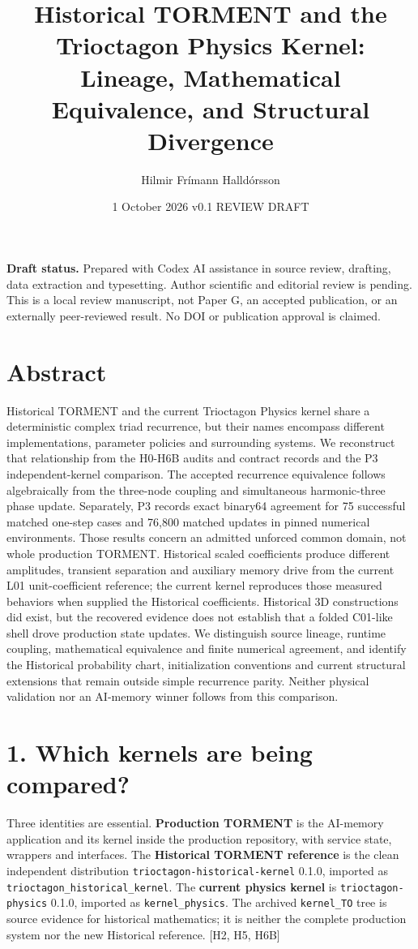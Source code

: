 \documentclass[
  11pt,
  a4paper,
]{article}
\title{Historical TORMENT and the Trioctagon Physics Kernel: Lineage, Mathematical Equivalence, and Structural Divergence}
\author{Hilmir Frímann Halldórsson}
\date{1 October 2026 \textbar{} v0.1 REVIEW DRAFT}
\begin{document}
\maketitle

\textbf{Draft status.} Prepared with Codex AI assistance in source review, drafting, data extraction and typesetting. Author scientific and editorial review is pending. This is a local review manuscript, not Paper G, an accepted publication, or an externally peer-reviewed result. No DOI or publication approval is claimed.

\section{Abstract}\label{abstract}

Historical TORMENT and the current Trioctagon Physics kernel share a deterministic complex triad recurrence, but their names encompass different implementations, parameter policies and surrounding systems. We reconstruct that relationship from the H0-H6B audits and contract records and the P3 independent-kernel comparison. The accepted recurrence equivalence follows algebraically from the three-node coupling and simultaneous harmonic-three phase update. Separately, P3 records exact binary64 agreement for 75 successful matched one-step cases and 76,800 matched updates in pinned numerical environments. Those results concern an admitted unforced common domain, not whole production TORMENT. Historical scaled coefficients produce different amplitudes, transient separation and auxiliary memory drive from the current L01 unit-coefficient reference; the current kernel reproduces those measured behaviors when supplied the Historical coefficients. Historical 3D constructions did exist, but the recovered evidence does not establish that a folded C01-like shell drove production state updates. We distinguish source lineage, runtime coupling, mathematical equivalence and finite numerical agreement, and identify the Historical probability chart, initialization conventions and current structural extensions that remain outside simple recurrence parity. Neither physical validation nor an AI-memory winner follows from this comparison.

\section{1. Which kernels are being compared?}\label{which-kernels-are-being-compared}

Three identities are essential. \textbf{Production TORMENT} is the AI-memory application and its kernel inside the production repository, with service state, wrappers and interfaces. The \textbf{Historical TORMENT reference} is the clean independent distribution \nolinkurl{trioctagon-historical-kernel} 0.1.0, imported as \nolinkurl{trioctagon_historical_kernel}. The \textbf{current physics kernel} is \texttt{trioctagon-physics} 0.1.0, imported as \texttt{kernel\_physics}. The archived \texttt{kernel\_TO} tree is source evidence for historical mathematics; it is neither the complete production system nor the new Historical reference. {[}H2, H5, H6B{]}
\end{document}
